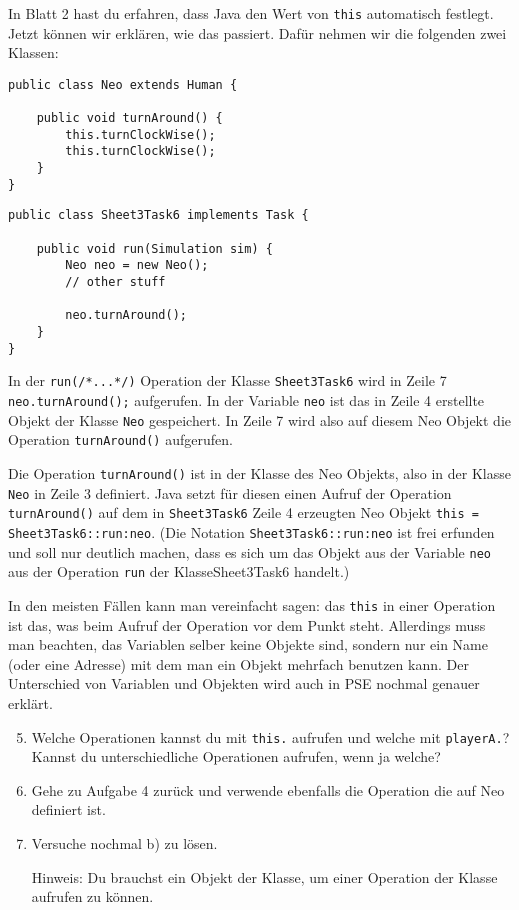 \begin{Infobox}
	In Blatt 2 hast du erfahren, dass Java den Wert von \lstinline{this} automatisch festlegt.
	Jetzt können wir erklären, wie das passiert.
	Dafür nehmen wir die folgenden zwei Klassen:

	\begin{lstlisting}[xleftmargin=0.5cm]
public class Neo extends Human {

    public void turnAround() {
        this.turnClockWise();
        this.turnClockWise();
    }
}
	\end{lstlisting}

	\begin{lstlisting}[xleftmargin=0.5cm]
public class Sheet3Task6 implements Task {
    
    public void run(Simulation sim) {
        Neo neo = new Neo();
        // other stuff
        
        neo.turnAround();
    }
}
	\end{lstlisting}

	In der \lstinline{run(/*...*/)} Operation der Klasse \lstinline{Sheet3Task6} wird in Zeile 7 \lstinline{neo.turnAround();} aufgerufen.
	In der Variable \lstinline{neo} ist das in Zeile 4 erstellte Objekt der Klasse \lstinline{Neo} gespeichert.
	In Zeile 7 wird also auf diesem Neo Objekt die Operation \lstinline{turnAround()} aufgerufen.

	Die Operation \lstinline{turnAround()} ist in der Klasse des Neo Objekts, also in der Klasse \lstinline{Neo} in Zeile 3 definiert.
	Java setzt für diesen einen Aufruf der Operation \lstinline{turnAround()} auf dem in \lstinline{Sheet3Task6} Zeile 4 erzeugten Neo Objekt \lstinline{this = Sheet3Task6::run:neo}.
	(Die Notation \lstinline{Sheet3Task6::run:neo} ist frei erfunden und soll nur deutlich machen, dass es sich um das Objekt aus der Variable \lstinline{neo} aus der Operation \lstinline{run} der Klasse{Sheet3Task6} handelt.)

	In den meisten Fällen kann man vereinfacht sagen: das \lstinline{this} in einer Operation ist das, was beim Aufruf der Operation vor dem Punkt steht.
	Allerdings muss man beachten, das Variablen selber keine Objekte sind, sondern nur ein Name (oder eine Adresse) mit dem man ein Objekt mehrfach benutzen kann.
	Der Unterschied von Variablen und Objekten wird auch in PSE nochmal genauer erklärt.

\end{Infobox}


\begin{enumerate}\setcounter{enumi}{4}
	\item \optional Welche Operationen kannst du mit \lstinline{this.} aufrufen und welche mit \lstinline{playerA.}? 
		Kannst du unterschiedliche Operationen aufrufen, wenn ja welche?

	\item 
		Gehe zu Aufgabe 4 zurück und verwende ebenfalls die Operation die auf Neo definiert ist.
	\item \optional Versuche nochmal b) zu lösen.

		Hinweis: Du brauchst ein Objekt der Klasse, um einer Operation der Klasse aufrufen zu können.
\end{enumerate}
